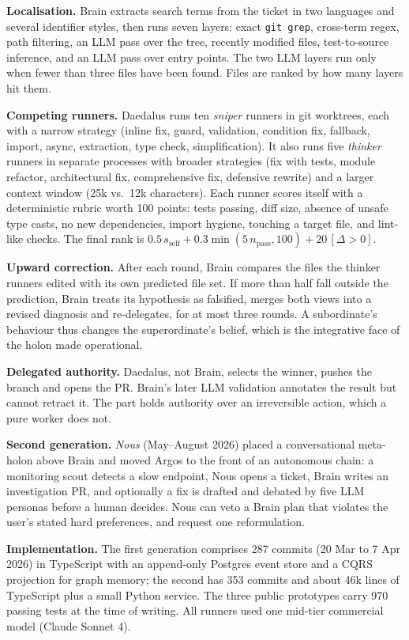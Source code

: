 \documentclass[conference]{IEEEtran}
\begin{document}
\textbf{Localisation.} Brain extracts search terms from the ticket in two
languages and several identifier styles, then runs seven layers:
exact \texttt{git grep}, cross-term regex, path filtering, an LLM pass over
the tree, recently modified files, test-to-source inference, and an LLM pass
over entry points. The two LLM layers run only when fewer than three files
have been found. Files are ranked by how many layers hit them.

\textbf{Competing runners.} Daedalus runs ten \emph{sniper} runners in git
worktrees, each with a narrow strategy (inline fix, guard, validation,
condition fix, fallback, import, async, extraction, type check,
simplification). It also runs five \emph{thinker} runners in separate
processes with broader strategies (fix with tests, module refactor,
architectural fix, comprehensive fix, defensive rewrite) and a larger
context window (25k vs.\ 12k characters). Each runner scores itself with a
deterministic rubric worth 100 points: tests passing, diff size, absence of
unsafe type casts, no new dependencies, import hygiene, touching a target
file, and lint-like checks. The final rank is
$0.5\,s_{\mathrm{self}} + 0.3\min(5\,n_{\mathrm{pass}},100) + 20\,[\Delta > 0]$.

\textbf{Upward correction.} After each round, Brain compares the files the
thinker runners edited with its own predicted file set. If more than half
fall outside the prediction, Brain treats its hypothesis as falsified,
merges both views into a revised diagnosis and re-delegates, for at most
three rounds. A subordinate's behaviour thus changes the superordinate's
belief, which is the integrative face of the holon made operational.

\textbf{Delegated authority.} Daedalus, not Brain, selects the winner, pushes
the branch and opens the PR. Brain's later LLM validation annotates the
result but cannot retract it. The part holds authority over an irreversible
action, which a pure worker does not.

\textbf{Second generation.} \emph{Nous} (May--August 2026) placed a
conversational meta-holon above Brain and moved Argos to the front of an
autonomous chain: a monitoring scout detects a slow endpoint, Nous opens a
ticket, Brain writes an investigation PR, and optionally a fix is drafted
and debated by five LLM personas before a human decides. Nous can veto a
Brain plan that violates the user's stated hard preferences, and request
one reformulation.

\textbf{Implementation.} The first generation comprises 287 commits (20 Mar
to 7 Apr 2026) in TypeScript with an append-only Postgres event store and a
CQRS projection for graph memory; the second has 353 commits and about 46k
lines of TypeScript plus a small Python service. The three public prototypes
\cite{coelho2026prototypes} carry 970 passing tests at the time of writing.
All runners used one mid-tier commercial model (Claude Sonnet 4).
\end{document}
